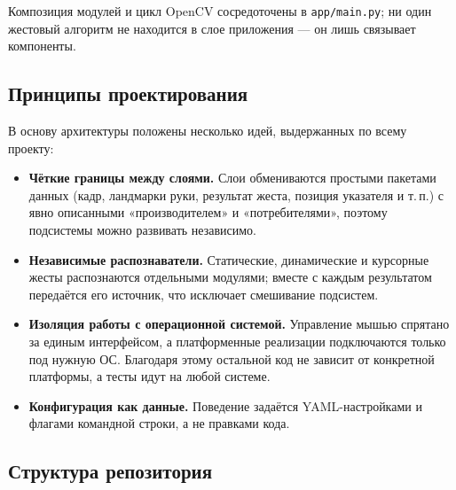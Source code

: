 \documentclass[11pt,a4paper]{article}
\begin{document}
\noindent Композиция модулей и цикл OpenCV сосредоточены в \texttt{app/main.py}; ни один
жестовый алгоритм не находится в слое приложения — он лишь связывает компоненты.

\subsection{Принципы проектирования}

В основу архитектуры положены несколько идей, выдержанных по всему проекту:

\begin{itemize}[leftmargin=1.4em]
  \item \textbf{Чёткие границы между слоями.} Слои обмениваются простыми пакетами данных
        (кадр, ландмарки руки, результат жеста, позиция указателя и т.\,п.) с явно описанными
        «производителем» и «потребителями», поэтому подсистемы можно развивать независимо.
  \item \textbf{Независимые распознаватели.} Статические, динамические и курсорные жесты
        распознаются отдельными модулями; вместе с каждым результатом передаётся его источник,
        что исключает смешивание подсистем.
  \item \textbf{Изоляция работы с операционной системой.} Управление мышью спрятано за единым
        интерфейсом, а платформенные реализации подключаются только под нужную ОС. Благодаря
        этому остальной код не зависит от конкретной платформы, а тесты идут на любой системе.
  \item \textbf{Конфигурация как данные.} Поведение задаётся YAML-настройками и флагами командной
        строки, а не правками кода.
\end{itemize}

\subsection{Структура репозитория}
\end{document}
